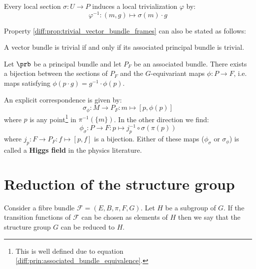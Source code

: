 	\begin{result}\label{diff:prin_section_triv}
		Every local section $\sigma:U\rightarrow P$ induces a local trivialization $\varphi$ by:
		\begin{equation}
			\varphi^{-1}:(m, g)\mapsto \sigma(m)\cdot g
		\end{equation}
	\end{result}
	
	Property \ref{diff:prop:trivial_vector_bundle_frames} can also be stated as follows:
	\begin{theorem}
		A vector bundle is trivial if and only if its associated principal bundle is trivial.
	\end{theorem}
	
	\begin{property}\label{diff:prin:section_bijection}
		Let $\prb$ be a principal bundle and let $P_F$ be an associated bundle. There exists a bijection between the sections of $P_F$ and the $G$-equivariant maps $\phi:P\rightarrow F$, i.e. maps satisfying $\phi(p\cdot g) = g^{-1}\cdot\phi(p)$.
		
		An explicit correspondence is given by:
		\begin{equation}
			\sigma_\phi:M\rightarrow P_F:m\mapsto [p, \phi(p)]
		\end{equation}
		where $p$ is any point\footnote{This is well defined due to equation \ref{diff:prin:associated_bundle_equivalence}.} in $\pi^{-1}(\{m\})$. In the other direction we find:
		\begin{equation}
			\label{diff:prin:section_bijection_phi}
			\phi_\sigma:P\rightarrow F: p\mapsto j_p^{-1}\circ\sigma(\pi(p))
		\end{equation}
		where $j_p:F\rightarrow P_F:f\mapsto[p, f]$ is a bijection. Either of these maps ($\phi_\sigma$ or $\sigma_\phi$) is called a \textbf{Higgs field} in the physics literature.
	\end{property}

\section{Reduction of the structure group}

	\begin{construct}
		Consider a fibre bundle $\mathcal{F} = (E, B, \pi, F, G)$. Let $H$ be a subgroup of $G$. If the transition functions of $\mathcal{F}$ can be chosen as elements of $H$ then we say that the structure group $G$ can be reduced to $H$.
	\end{construct}
	
